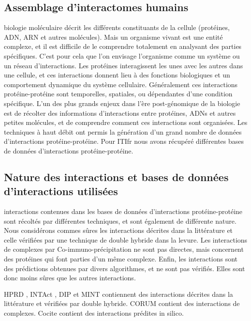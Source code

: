 		\subsection{\textcolor{mygreen}{Assemblage d'interactomes humains}}
			 biologie moléculaire décrit les différents constituants de la cellule (protéines, \acs{ADN}, \acs{ARN} et autres molécules). Mais un organisme vivant est une entité complexe, et il est difficile de le comprendre totalement en analysant des parties spécifiques. C'est pour cela que l'on envisage l'organisme comme un système ou un réseau d'interactions.
			Les protéines interagissent les unes avec les autres dans une cellule, et ces interactions donnent lieu à des fonctions biologiques et un comportement dynamique du système cellulaire. Généralement ces interactions protéine-protéine sont temporelles, spatiales, ou dépendantes d'une condition spécifique.
			L'un des plus grands enjeux dans l'ère post-génomique de la biologie est de récolter des informations d'interactions entre protéines, \acsp{ADN} et autres petites molécules, et de comprendre comment ces interactions sont organisées.
			Les techniques à haut débit ont permis la génération d'un grand nombre de données d'interactions protéine-protéine.
			Pour \acs{ITIfr} nous avons récupéré différentes bases de données d'interactions protéine-protéine.

		\subsection{\textcolor{mygreen}{Nature des interactions et bases de données d'interactions utilisées}}
			 interactions contenues dans les bases de données d'interactions protéine-protéine sont récoltés par différentes techniques, et sont également de différente nature.
			Nous considérons commes sûres les interactions décrites dans la littérature et celle vérifiées par une technique de double hybride dans la levure.
			Les interactions de complexes par Co-immuno-précipitation ne sont pas directes, mais concernent des protéines qui font parties d'un même complexe.
			Enfin, les interactions sont des prédictions obtenues par divers algorithmes, et ne sont pas vérifiés.
			Elles sont donc moins sûres que les autres interactions. 

			HPRD \citep{Prasad2009}, INTAct \citep{Aranda2010}, DIP \citep{Xenarios2000} et MINT \citep{Zanzoni2002} contiennent des interactions décrites dans la littérature et vérifiées par double hybride.
			CORUM \citep{Ruepp2008} contient des interactions de complexes.
			Cocite \citep{Ramani2005} contient des interactions prédites in silico.


